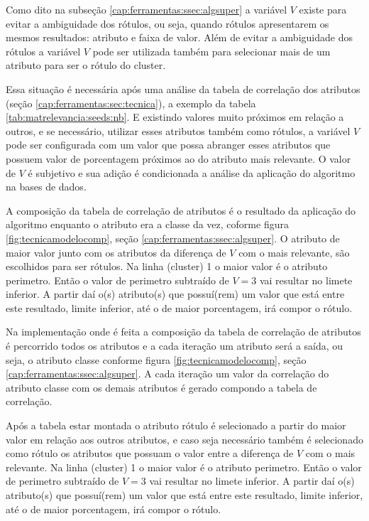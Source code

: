 Como dito na subseção \ref{cap:ferramentas:ssec:algsuper} a variável ${V}$ existe para evitar a ambiguidade dos rótulos, ou seja, quando rótulos apresentarem os mesmos resultados: atributo e faixa de valor. Além de evitar a ambiguidade dos rótulos a variável ${V}$ pode ser utilizada também para selecionar mais de um atributo para ser o rótulo do cluster.

Essa situação é necessária após uma análise da tabela de correlação dos atributos (seção \ref{cap:ferramentas:sec:tecnica}), a exemplo da tabela \ref{tab:matrelevancia:seeds:nb}. E existindo valores muito próximos em relação a outros, e se necessário, utilizar esses atributos também como rótulos, a variável ${V}$ pode ser configurada com um valor que possa abranger esses atributos que possuem valor de porcentagem próximos ao do atributo mais relevante. O valor de ${V}$ é subjetivo e sua adição é condicionada a análise da aplicação do algoritmo na bases de dados.

A composição da tabela de correlação de atributos é o resultado da aplicação do algoritmo enquanto o atributo era a classe da vez, coforme figura \ref{fig:tecnicamodelocomp}, seção \ref{cap:ferramentas:ssec:algsuper}. O atributo de maior valor junto com os atributos da diferença de ${V}$ com o mais relevante, são escolhidos para ser rótulos. Na linha (cluster) 1 o maior valor é o atributo perimetro. Então o valor de perimetro subtraído de ${V=3}$ vai resultar no limete inferior. A partir daí o(s) atributo(s) que possuí(rem) um valor que está entre este resultado, limite inferior, até o de maior porcentagem, irá compor o rótulo.

Na implementação onde é feita a composição da tabela de correlação de atributos é percorrido todos os atributos e a cada iteração um atributo será a saída, ou seja, o atributo classe conforme figura \ref{fig:tecnicamodelocomp}, seção \ref{cap:ferramentas:ssec:algsuper}. A cada iteração um valor da correlação do atributo classe com os demais atributos é gerado compondo a tabela de correlação.

Após a tabela estar montada o atributo rótulo é selecionado a partir do maior valor em relação aos outros atributos, e caso seja necessário também é selecionado como rótulo os atributos que possuam o valor entre a diferença de ${V}$ com o mais relevante. Na linha (cluster) 1 o maior valor é o atributo perimetro. Então o valor de perimetro subtraído de ${V=3}$ vai resultar no limete inferior. A partir daí o(s) atributo(s) que possuí(rem) um valor que está entre este resultado, limite inferior, até o de maior porcentagem, irá compor o rótulo.


